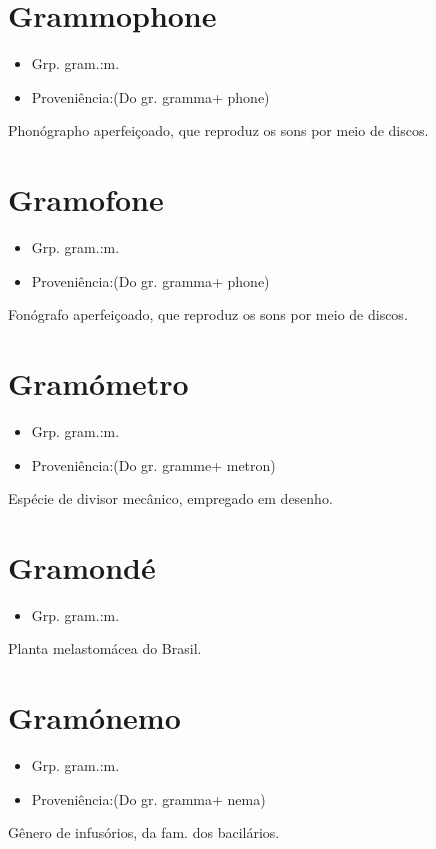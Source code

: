 \section{Grammophone}
\begin{itemize}
\item {Grp. gram.:m.}
\end{itemize}
\begin{itemize}
\item {Proveniência:(Do gr. \textunderscore gramma\textunderscore  + \textunderscore phone\textunderscore )}
\end{itemize}
Phonógrapho aperfeiçoado, que reproduz os sons por meio de discos.
\section{Gramofone}
\begin{itemize}
\item {Grp. gram.:m.}
\end{itemize}
\begin{itemize}
\item {Proveniência:(Do gr. \textunderscore gramma\textunderscore  + \textunderscore phone\textunderscore )}
\end{itemize}
Fonógrafo aperfeiçoado, que reproduz os sons por meio de discos.
\section{Gramómetro}
\begin{itemize}
\item {Grp. gram.:m.}
\end{itemize}
\begin{itemize}
\item {Proveniência:(Do gr. \textunderscore gramme\textunderscore  + \textunderscore metron\textunderscore )}
\end{itemize}
Espécie de divisor mecânico, empregado em desenho.
\section{Gramondé}
\begin{itemize}
\item {Grp. gram.:m.}
\end{itemize}
Planta melastomácea do Brasil.
\section{Gramónemo}
\begin{itemize}
\item {Grp. gram.:m.}
\end{itemize}
\begin{itemize}
\item {Proveniência:(Do gr. \textunderscore gramma\textunderscore  + \textunderscore nema\textunderscore )}
\end{itemize}
Gênero de infusórios, da fam. dos bacilários.
